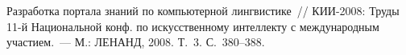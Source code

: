 \begin{multicols}{2}
{{\begin{thebibliography}{99}
\label{end\stat}
  
  Разработка портала знаний по компьютерной лингвистике~// КИИ-2008: Труды 11-й 
Национальной конф. по искусственному интеллекту с международным участием.~--- М.: 
ЛЕНАНД, 2008. Т.~3. С.~380--388.
  
 \end{thebibliography}
}
}


\end{multicols}